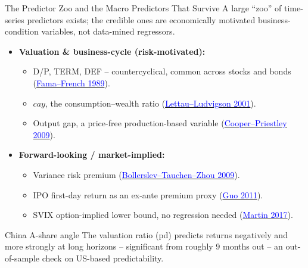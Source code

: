 \documentclass{beamer}
\begin{document}
\begin{frame}{The Predictor Zoo and the Macro Predictors That Survive}
\small
A large ``zoo'' of time-series predictors exists; the credible ones are \alert{economically motivated} business-condition variables, not data-mined regressors.
\begin{itemize}
  \item \textbf{Valuation \& business-cycle (risk-motivated):}
  \begin{itemize}\small
    \item D/P, TERM, DEF -- countercyclical, common across stocks and bonds (\href{https://doi.org/10.1016/0304-405X(89)90095-0}{\textcolor{blue}{Fama--French 1989}}).
    \item $cay$, the consumption--wealth ratio (\href{https://doi.org/10.1111/0022-1082.00347}{\textcolor{blue}{Lettau--Ludvigson 2001}}).
    \item Output gap, a price-free production-based variable (\href{https://doi.org/10.1093/rfs/hhn087}{\textcolor{blue}{Cooper--Priestley 2009}}).
  \end{itemize}
  \item \textbf{Forward-looking / market-implied:}
  \begin{itemize}\small
    \item Variance risk premium (\href{https://doi.org/10.1093/rfs/hhp008}{\textcolor{blue}{Bollerslev--Tauchen--Zhou 2009}}).
    \item IPO first-day return as an ex-ante premium proxy (\href{https://doi.org/10.1093/rfs/hhr093}{\textcolor{blue}{Guo 2011}}).
    \item SVIX option-implied lower bound, no regression needed (\href{https://doi.org/10.1093/qje/qjw034}{\textcolor{blue}{Martin 2017}}).
  \end{itemize}
\end{itemize}
\begin{block}{China A-share angle}
The valuation ratio (pd) predicts returns \alert{negatively} and \alert{more strongly at long horizons} -- significant from roughly 9 months out -- an out-of-sample check on US-based predictability.
\end{block}
\end{frame}
\end{document}
